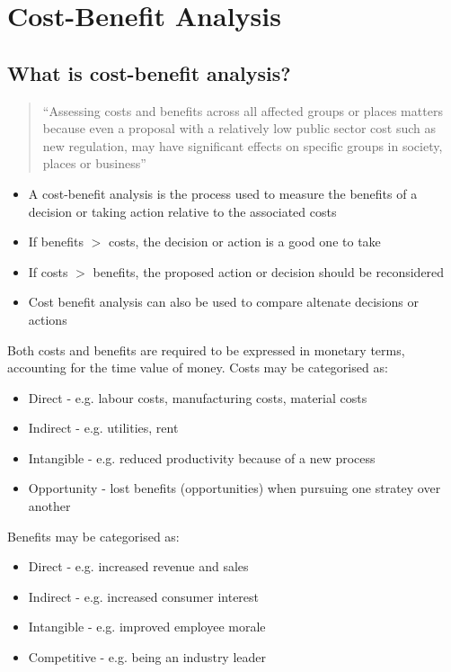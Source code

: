 \documentclass[class=report, crop=false, 12pt,a4paper]{standalone}
\begin{document}
\chapter{Cost-Benefit Analysis}
\section{What is cost-benefit analysis?}
\begin{quote}
	``Assessing costs and benefits across all affected groups or places matters because even a proposal with a relatively low public sector cost such as new regulation, may have significant effects on specific groups in society, places or business''
\end{quote}
\begin{itemize}
	\item A cost-benefit analysis is the process used to measure the benefits of a decision or taking action relative to the associated costs
	\item If benefits $>$ costs, the decision or action is a good one to take
	\item If costs $>$ benefits, the proposed action or decision should be reconsidered
	\item Cost benefit analysis can also be used to compare altenate decisions or actions
\end{itemize}
Both costs and benefits are required to be expressed in monetary terms, accounting for the time value of money. Costs may be categorised as:
\begin{itemize}
	\item Direct - e.g. labour costs, manufacturing costs, material costs
	\item Indirect - e.g. utilities, rent
	\item Intangible - e.g. reduced productivity because of a new process
	\item Opportunity - lost benefits (opportunities) when pursuing one stratey over another 
\end{itemize}
Benefits may be categorised as:
\begin{itemize}
	\item Direct - e.g. increased revenue and sales
	\item Indirect - e.g. increased consumer interest
	\item Intangible - e.g. improved employee morale
	\item Competitive - e.g. being an industry leader
\end{itemize}
\end{document}
